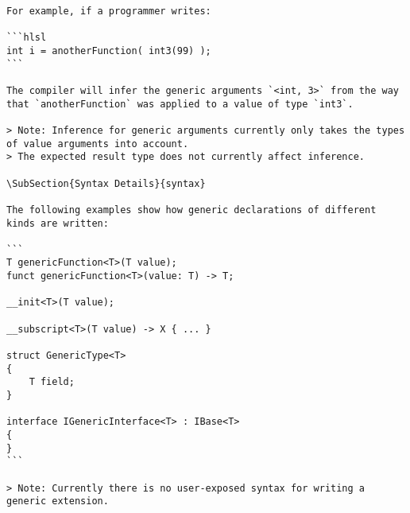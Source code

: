 \begin{verbatim}
For example, if a programmer writes:

```hlsl
int i = anotherFunction( int3(99) );
```

The compiler will infer the generic arguments `<int, 3>` from the way that `anotherFunction` was applied to a value of type `int3`.

> Note: Inference for generic arguments currently only takes the types of value arguments into account.
> The expected result type does not currently affect inference.

\SubSection{Syntax Details}{syntax}

The following examples show how generic declarations of different kinds are written:

```
T genericFunction<T>(T value);
funct genericFunction<T>(value: T) -> T;

__init<T>(T value);

__subscript<T>(T value) -> X { ... }

struct GenericType<T>
{
    T field;
}

interface IGenericInterface<T> : IBase<T>
{
}
```

> Note: Currently there is no user-exposed syntax for writing a generic extension.

\end{verbatim}
